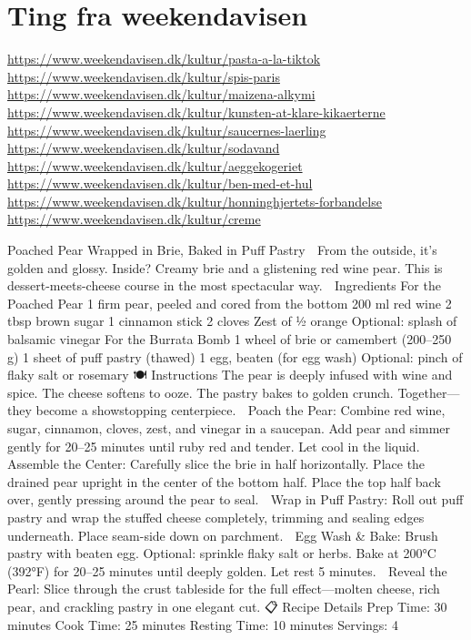 \documentclass[
]{book}
\begin{document}
\hypertarget{ting-fra-weekendavisen}{%
\section{Ting fra weekendavisen}\label{ting-fra-weekendavisen}}

\url{https://www.weekendavisen.dk/kultur/pasta-a-la-tiktok}
\url{https://www.weekendavisen.dk/kultur/spis-paris}
\url{https://www.weekendavisen.dk/kultur/maizena-alkymi}
\url{https://www.weekendavisen.dk/kultur/kunsten-at-klare-kikaerterne}
\url{https://www.weekendavisen.dk/kultur/saucernes-laerling}
\url{https://www.weekendavisen.dk/kultur/sodavand}
\url{https://www.weekendavisen.dk/kultur/aeggekogeriet}
\url{https://www.weekendavisen.dk/kultur/ben-med-et-hul}
\url{https://www.weekendavisen.dk/kultur/honninghjertets-forbandelse}
\url{https://www.weekendavisen.dk/kultur/creme}

Poached Pear Wrapped in Brie, Baked in Puff Pastry 💫
From the outside, it's golden and glossy. Inside? Creamy brie and a glistening red wine pear.
This is dessert-meets-cheese course in the most spectacular way.
🛒 Ingredients
For the Poached Pear
1 firm pear, peeled and cored from the bottom
200 ml red wine
2 tbsp brown sugar
1 cinnamon stick
2 cloves
Zest of ½ orange
Optional: splash of balsamic vinegar
For the Burrata Bomb
1 wheel of brie or camembert (200--250 g)
1 sheet of puff pastry (thawed)
1 egg, beaten (for egg wash)
Optional: pinch of flaky salt or rosemary
🍽️ Instructions
The pear is deeply infused with wine and spice. The cheese softens to ooze. The pastry bakes to golden crunch. Together---they become a showstopping centerpiece.
🍷 Poach the Pear: Combine red wine, sugar, cinnamon, cloves, zest, and vinegar in a saucepan. Add pear and simmer gently for 20--25 minutes until ruby red and tender. Let cool in the liquid.
🧀 Assemble the Center: Carefully slice the brie in half horizontally. Place the drained pear upright in the center of the bottom half. Place the top half back over, gently pressing around the pear to seal.
🧈 Wrap in Puff Pastry: Roll out puff pastry and wrap the stuffed cheese completely, trimming and sealing edges underneath. Place seam-side down on parchment.
🥚 Egg Wash \& Bake: Brush pastry with beaten egg. Optional: sprinkle flaky salt or herbs. Bake at 200°C (392°F) for 20--25 minutes until deeply golden. Let rest 5 minutes.
🔪 Reveal the Pearl: Slice through the crust tableside for the full effect---molten cheese, rich pear, and crackling pastry in one elegant cut.
📋 Recipe Details
Prep Time: 30 minutes
Cook Time: 25 minutes
Resting Time: 10 minutes
Servings: 4
\end{document}
